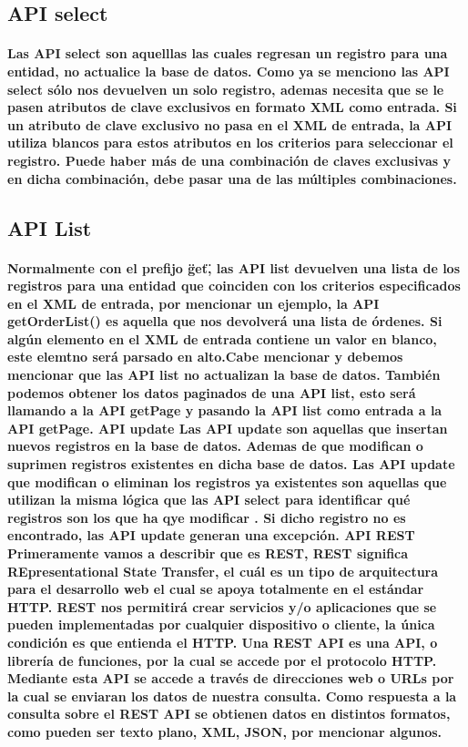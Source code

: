   \subsection{API select}
    \paragraph{Las API select son aquelllas las cuales regresan un registro para una entidad, no actualice la base de datos. Como ya se menciono las API select sólo nos devuelven un solo registro, ademas necesita que se le pasen atributos de clave exclusivos en formato XML como entrada. Si un atributo de clave exclusivo no pasa en el XML de entrada, la API utiliza blancos para estos atributos en los criterios para seleccionar el registro. Puede haber más de una combinación de claves exclusivas y en dicha combinación, debe pasar una de las múltiples combinaciones. }

  \subsection{API List}
    \paragraph{Normalmente con el prefijo \"get\", las API list devuelven una lista de los registros para una entidad que coinciden con los criterios especificados en el XML de entrada, por mencionar un ejemplo, la API getOrderList() es aquella que nos devolverá una lista de órdenes. Si algún elemento en el XML de entrada contiene un valor en blanco, este elemtno será parsado en alto.Cabe mencionar y debemos mencionar que las API list no actualizan la base de datos. También podemos obtener los datos paginados de una API list, esto será llamando a la API getPage y pasando la API list como entrada a la API getPage. API update Las API update son aquellas que insertan nuevos registros en la base de datos. Ademas de que modifican o suprimen registros existentes en dicha base de datos. Las API update que modifican o eliminan los registros ya existentes son aquellas que utilizan la misma lógica que las API select para identificar qué registros son los que ha qye modificar . Si dicho registro no es encontrado, las API update generan una excepción. API REST Primeramente vamos a describir que es REST, REST significa REpresentational State Transfer, el cuál es un tipo de arquitectura para el desarrollo web el cual se apoya totalmente en el estándar HTTP. REST nos permitirá crear servicios y/o aplicaciones que se pueden implementadas por cualquier dispositivo o cliente, la única condición es que entienda el HTTP. Una REST API es una API, o librería de funciones, por la cual se accede por el protocolo HTTP. Mediante esta API se accede a través de direcciones web o URLs por la cual se enviaran los datos de nuestra consulta. Como respuesta a la consulta sobre el REST API se obtienen datos en distintos formatos, como pueden ser texto plano, XML, JSON, por mencionar algunos. }

